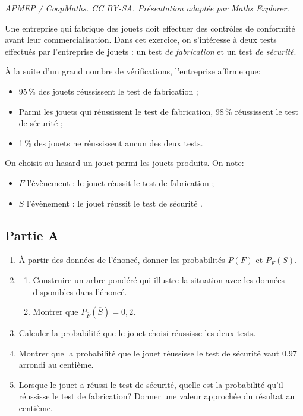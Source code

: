 \documentclass[10pt]{article}
\begin{document}
\noindent\textit{APMEP / CoopMaths. CC BY-SA. Présentation adaptée par Maths Explorer.}\par\medskip
Une entreprise qui fabrique des jouets doit effectuer des contrôles de conformité avant leur commercialisation. Dans cet exercice, on s'intéresse à deux tests effectués par l'entreprise de jouets : un test \emph{de fabrication} et un test \emph{de sécurité}.

\medskip

À la suite d'un grand nombre de vérifications, l'entreprise affirme que:

\begin{itemize}[label=$\bullet~$]
\item 95\,\% des jouets réussissent le test de fabrication ;
\item Parmi les jouets qui réussissent le test de fabrication, 98\,\% réussissent le test de sécurité ;
\item 1\,\% des jouets ne réussissent aucun des deux tests.
\end{itemize}

On choisit au hasard un jouet parmi les jouets produits. On note:

\begin{itemize}[label=$\bullet~$]
\item $F$ l'évènement : \og le jouet réussit le test de fabrication \fg{} ;
\item $S$ l'évènement : \og le jouet réussit le test de sécurité \fg.
\end{itemize}

\subsection*{Partie A}

\begin{enumerate}
\item À partir des données de l'énoncé, donner les probabilités $P(F)$ et $P_F(S)$.
\item
	\begin{enumerate}
		\item Construire un arbre pondéré qui illustre la situation avec les données disponibles dans l'énoncé.
		\item Montrer que $P_{\overline{F}}\left(\overline{S}\right) = 0,2$.
\end{enumerate}
\item Calculer la probabilité que le jouet choisi réussisse les deux tests.
\item Montrer que la probabilité que le jouet réussisse le test de sécurité vaut 0,97 arrondi au centième.
\item Lorsque le jouet a réussi le test de sécurité, quelle est la probabilité qu'il réussisse le test de fabrication? Donner une valeur approchée du résultat au centième.
\end{enumerate}
\end{document}
